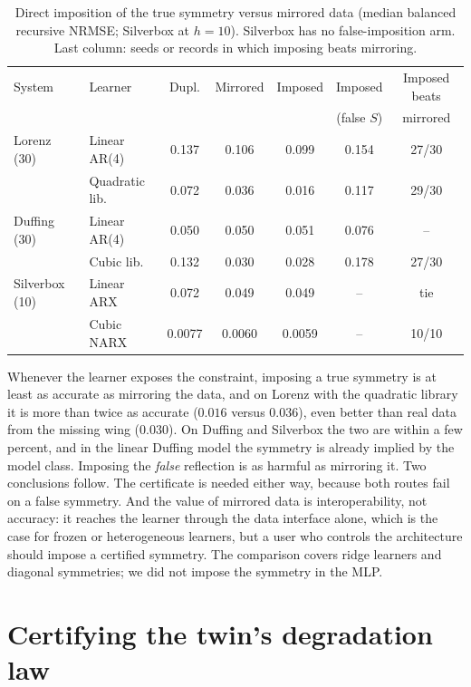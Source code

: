 \begin{table}[H]\centering\small
\caption{Direct imposition of the true symmetry versus mirrored data (median balanced recursive NRMSE; Silverbox at $h=10$). Silverbox has no false-imposition arm. Last column: seeds or records in which imposing beats mirroring.}\label{tab:imposed}
\begin{tabular}{@{}llccccc@{}}
\toprule
System & Learner & Dupl. & Mirrored & Imposed & Imposed & Imposed beats\\
 & & & & & (false $S$) & mirrored\\
\midrule
Lorenz (30) & Linear AR(4) & 0.137 & 0.106 & 0.099 & 0.154 & 27/30\\
 & Quadratic lib. & 0.072 & 0.036 & 0.016 & 0.117 & 29/30\\
Duffing (30) & Linear AR(4) & 0.050 & 0.050 & 0.051 & 0.076 & --\\
 & Cubic lib. & 0.132 & 0.030 & 0.028 & 0.178 & 27/30\\
Silverbox (10) & Linear ARX & 0.072 & 0.049 & 0.049 & -- & tie\\
 & Cubic NARX & 0.0077 & 0.0060 & 0.0059 & -- & 10/10\\
\bottomrule
\end{tabular}
\end{table}
Whenever the learner exposes the constraint, imposing a true symmetry is at least as accurate as mirroring the data, and on Lorenz with the quadratic library it is more than twice as accurate ($0.016$ versus $0.036$), even better than real data from the missing wing ($0.030$). On Duffing and Silverbox the two are within a few percent, and in the linear Duffing model the symmetry is already implied by the model class. Imposing the \emph{false} reflection is as harmful as mirroring it. Two conclusions follow. The certificate is needed either way, because both routes fail on a false symmetry. And the value of mirrored data is interoperability, not accuracy: it reaches the learner through the data interface alone, which is the case for frozen or heterogeneous learners, but a user who controls the architecture should impose a certified symmetry. The comparison covers ridge learners and diagonal symmetries; we did not impose the symmetry in the MLP.

\section{Certifying the twin's degradation law}\label{app:twin-screen}
